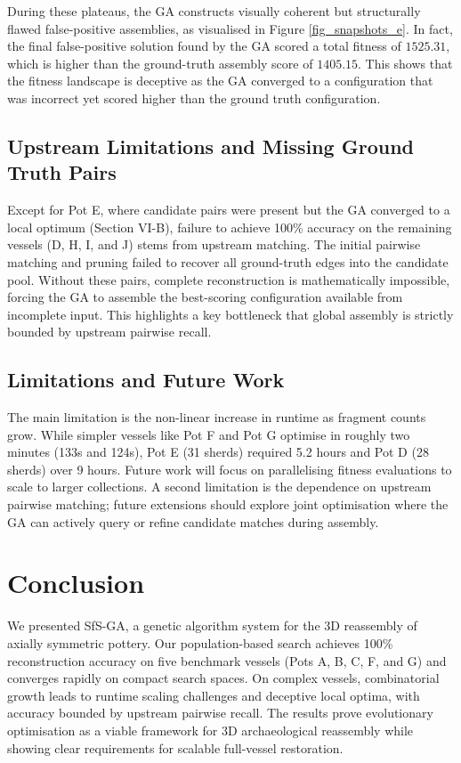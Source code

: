 \documentclass[conference]{IEEEtran}
\begin{document}
During these plateaus, the GA constructs visually coherent but structurally flawed false-positive assemblies, as visualised in Figure \ref{fig_snapshots_e}. In fact, the final false-positive solution found by the GA scored a total fitness of $1525.31$, which is higher than the ground-truth assembly score of $1405.15$. This shows that the fitness landscape is deceptive as the GA converged to a configuration that was incorrect yet scored higher than the ground truth configuration.

\subsection{Upstream Limitations and Missing Ground Truth Pairs}
Except for Pot E, where candidate pairs were present but the GA converged to a local optimum (Section VI-B), failure to achieve 100\% accuracy on the remaining vessels (D, H, I, and J) stems from upstream matching. The initial pairwise matching and pruning failed to recover all ground-truth edges into the candidate pool. Without these pairs, complete reconstruction is mathematically impossible, forcing the GA to assemble the best-scoring configuration available from incomplete input. This highlights a key bottleneck that global assembly is strictly bounded by upstream pairwise recall.

\subsection{Limitations and Future Work}
The main limitation is the non-linear increase in runtime as fragment counts grow. While simpler vessels like Pot F and Pot G optimise in roughly two minutes (133s and 124s), Pot E (31 sherds) required 5.2 hours and Pot D (28 sherds) over 9 hours. Future work will focus on parallelising fitness evaluations to scale to larger collections. A second limitation is the dependence on upstream pairwise matching; future extensions should explore joint optimisation where the GA can actively query or refine candidate matches during assembly.

\section{Conclusion}
We presented SfS-GA, a genetic algorithm system for the 3D reassembly of axially symmetric pottery. Our population-based search achieves 100\% reconstruction accuracy on five benchmark vessels (Pots A, B, C, F, and G) and converges rapidly on compact search spaces. On complex vessels, combinatorial growth leads to runtime scaling challenges and deceptive local optima, with accuracy bounded by upstream pairwise recall. The results prove evolutionary optimisation as a viable framework for 3D archaeological reassembly while showing clear requirements for scalable full-vessel restoration.



\end{document}
